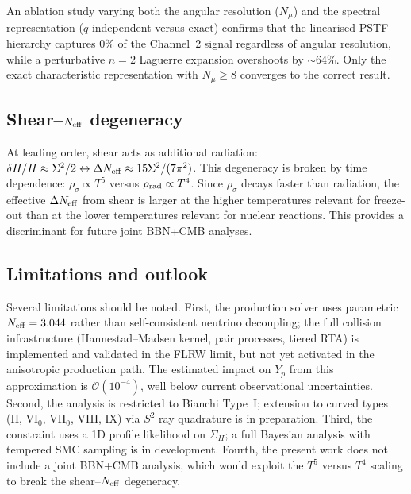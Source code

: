 \documentclass[a4paper,11pt]{article}
\newcommand{\Sig}{\Sigma}
\newcommand{\SigH}{\Sigma_H}
\newcommand{\Yp}{Y_p}
\newcommand{\Neff}{N_{\rm eff}}
\newcommand{\order}{\mathcal{O}}
\begin{document}
An ablation study varying both the angular resolution ($N_\mu$) and the spectral representation ($q$-independent versus exact) confirms that the linearised PSTF hierarchy captures 0\% of the Channel~2 signal regardless of angular resolution, while a perturbative $n = 2$ Laguerre expansion overshoots by $\sim$64\%.  Only the exact characteristic representation with $N_\mu \geq 8$ converges to the correct result.

\subsection{Shear--$\Neff$ degeneracy}

At leading order, shear acts as additional radiation: $\delta H/H \approx \Sig^2/2 \leftrightarrow \Delta\Neff \approx 15\Sig^2/(7\pi^2)$.  This degeneracy is broken by time dependence: $\rho_\sigma \propto T^5$ versus $\rho_{\rm rad} \propto T^4$.  Since $\rho_\sigma$ decays faster than radiation, the effective $\Delta\Neff$ from shear is larger at the higher temperatures relevant for freeze-out than at the lower temperatures relevant for nuclear reactions.  This provides a discriminant for future joint BBN+CMB analyses.

\subsection{Limitations and outlook}

Several limitations should be noted.  First, the production solver uses parametric $\Neff = 3.044$ rather than self-consistent neutrino decoupling; the full collision infrastructure (Hannestad--Madsen kernel, pair processes, tiered RTA) is implemented and validated in the FLRW limit, but not yet activated in the anisotropic production path.  The estimated impact on $\Yp$ from this approximation is $\order(10^{-4})$, well below current observational uncertainties.  Second, the analysis is restricted to Bianchi Type~I; extension to curved types (II, VI$_0$, VII$_0$, VIII, IX) via $S^2$ ray quadrature is in preparation.  Third, the constraint uses a 1D profile likelihood on $\SigH$; a full Bayesian analysis with tempered SMC sampling is in development.  Fourth, the present work does not include a joint BBN+CMB analysis, which would exploit the $T^5$ versus $T^4$ scaling to break the shear--$\Neff$ degeneracy.


\end{document}
